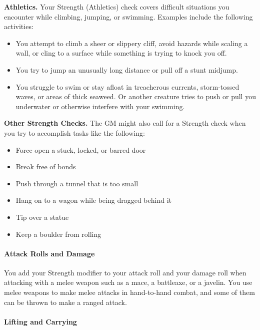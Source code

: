 \documentclass[
]{article}
\providecommand{\tightlist}{%
  \setlength{\itemsep}{0pt}\setlength{\parskip}{0pt}}
\begin{document}
\textbf{Athletics.} Your Strength (Athletics) check covers difficult
situations you encounter while climbing, jumping, or swimming. Examples
include the following activities:

\begin{itemize}
\tightlist
\item
  You attempt to climb a sheer or slippery cliff, avoid hazards while
  scaling a wall, or cling to a surface while something is trying to
  knock you off.
\item
  You try to jump an unusually long distance or pull off a stunt
  midjump.
\item
  You struggle to swim or stay afloat in treacherous currents,
  storm-tossed waves, or areas of thick seaweed. Or another creature
  tries to push or pull you underwater or otherwise interfere with your
  swimming.
\end{itemize}

\textbf{Other Strength Checks.} The GM might also call for a Strength
check when you try to accomplish tasks like the following:

\begin{itemize}
\tightlist
\item
  Force open a stuck, locked, or barred door
\item
  Break free of bonds
\item
  Push through a tunnel that is too small
\item
  Hang on to a wagon while being dragged behind it
\item
  Tip over a statue
\item
  Keep a boulder from rolling
\end{itemize}

\hypertarget{attack-rolls-and-damage}{%
\paragraph{Attack Rolls and Damage}\label{attack-rolls-and-damage}}

You add your Strength modifier to your attack roll and your damage roll
when attacking with a melee weapon such as a mace, a battleaxe, or a
javelin. You use melee weapons to make melee attacks in hand-to-hand
combat, and some of them can be thrown to make a ranged attack.

\hypertarget{lifting-and-carrying}{%
\paragraph{Lifting and Carrying}\label{lifting-and-carrying}}
\end{document}

